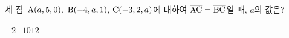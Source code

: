 세 점~$\mathrm{A}(a{,}\mkern3mu\mathopen{}5{,}\mkern3mu\mathopen{}0)$, $\mathrm{B}(-4{,}\mkern3mu\mathopen{}a{,}\mkern3mu\mathopen{}1)$, $\mathrm{C}(-3{,}\mkern3mu\mathopen{}2{,}\mkern3mu\mathopen{}a)$에 대하여 $\overline{\mathrm{AC}}=\overline{\mathrm{BC}}$일 때, $a$의 값은?
\begin{choices32}{$-2$}{$-1$}{$0$}{$1$}{$2$}\end{choices32}
